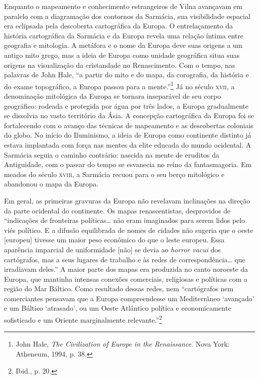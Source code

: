 Enquanto o mapeamento e conhecimento estrangeiros de Vilna avançavam em
paralelo com a diagramação dos contornos da Sarmácia, sua visibilidade
espacial era eclipsada pela descoberta cartográfica da Europa. O
entrelaçamento da história cartográfica da Sarmácia e da Europa revela
uma relação íntima entre geografia e mitologia. A metáfora e o nome da
Europa deve suas origens a um antigo mito grego, mas a ideia de Europa
como unidade geográfica situa suas origens na visualização da
cristandade no Renascimento. Com o tempo, nas palavras de John Hale, ``a
partir do mito e do mapa, da corografia, da história e do exame
topográfico, a Europa passou para a mente.''\footnote{John Hale, \textit{The Civilization of Europe in the Renaissance}. Nova York: Atheneum, 1994, p. 38.} Já no século \textsc{xvii}, a denominação mitológica da Europa se tornara inseparável de seu corpo geográfico: rodeada e
protegida por água por três lados, a Europa gradualmente se dissolvia no
vasto território da Ásia. A concepção cartográfica da Europa foi se
fortalecendo com o avanço das técnicas de mapeamento e as descobertas
coloniais do globo. No início do Iluminismo, a ideia de Europa como
continente distinto já estava implantada com força nas mentes da elite
educada do mundo ocidental. A Sarmácia seguia o caminho contrário:
nascida na mente de eruditos da Antiguidade, com o passar do tempo se
esvanecia no reino da fantasmagoria. Em meados do século \textsc{xviii}, a Sarmácia
recuou para o seu berço mitológico e abandonou o mapa da Europa.

Em geral, as primeiras gravuras da Europa não revelavam inclinações na
direção da parte ocidental do continente. Os mapas renascentistas,
desprovidos de ``indicações de fronteiras políticas\ldots{} não eram
imaginados para serem lidos pelo viés político. E a difusão equilibrada
de nomes de cidades não sugeria que o oeste {[}europeu{]} tivesse um
maior peso econômico do que o leste europeu. Essa aparência imparcial de
uniformidade {[}não{]} se devia ao \textit{horror vacui} dos cartógrafos,
mas a seus lugares de trabalho e às redes de correspondência\ldots{} que
irradiavam deles.'' A maior parte dos mapas era produzida no canto
noroeste da Europa, que mantinha intensas conexões comerciais,
religiosas e políticas com a região do Mar Báltico. Como resultado
dessas redes, nem ``cartógrafos nem comerciantes pensavam que a Europa
compreendesse um Mediterrâneo `avançado' e um Báltico `atrasado', ou um
Oeste Atlântico política e economicamente sofisticado e um Oriente
marginalmente relevante.''\footnote{Ibid., p. 20.}

